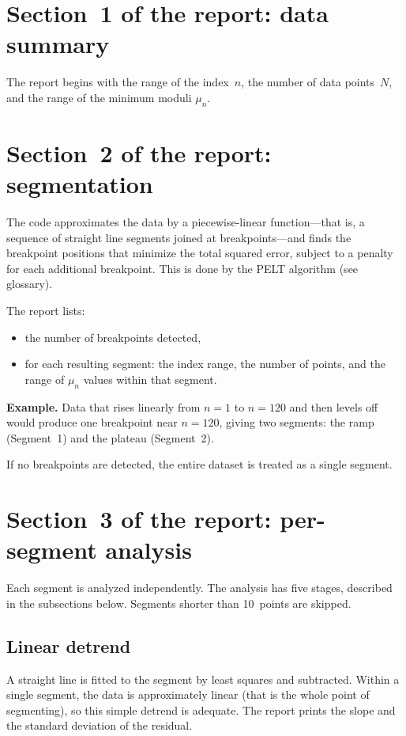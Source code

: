 \documentclass[11pt]{article}
\begin{document}
\section{Section~1 of the report: data summary}

The report begins with the range of the index~$n$, the number of data
points~$N$, and the range of the minimum moduli $\mu_n$.

\section{Section~2 of the report: segmentation}
\label{sec:segmentation}

The code approximates the data by a piecewise-linear function---that is,
a sequence of straight line segments joined at breakpoints---and finds the
breakpoint positions that minimize the total squared error, subject to a
penalty for each additional breakpoint.  This is done by the PELT
algorithm (see glossary).

The report lists:
\begin{itemize}
\item the number of breakpoints detected,
\item for each resulting segment: the index range, the number of points,
  and the range of $\mu_n$ values within that segment.
\end{itemize}

\noindent\textbf{Example.}  Data that rises linearly from $n=1$ to
$n=120$ and then levels off would produce one breakpoint near $n=120$,
giving two segments: the ramp (Segment~1) and the plateau (Segment~2).

If no breakpoints are detected, the entire dataset is treated as a single
segment.

\section{Section~3 of the report: per-segment analysis}

Each segment is analyzed independently.  The analysis has five stages,
described in the subsections below.  Segments shorter than 10~points are
skipped.

\subsection{Linear detrend}

A straight line is fitted to the segment by least squares and subtracted.
Within a single segment, the data is approximately linear (that is the
whole point of segmenting), so this simple detrend is adequate.  The
report prints the slope and the standard deviation of the residual.
\end{document}
